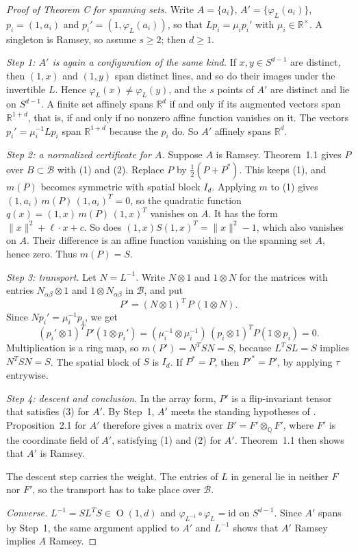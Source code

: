 \documentclass[11pt]{amsart}
\newcommand{\Q}{\mathbb{Q}}
\newcommand{\R}{\mathbb{R}}
\DeclareMathOperator{\Ort}{O}
\theoremstyle{plain}
\theoremstyle{definition}
\begin{document}
\begin{proof}[Proof of Theorem C for spanning sets]
Write $A=\{a_i\}$, $A'=\{\varphi_L(a_i)\}$, $p_i=(1,a_i)$ and $p_i'=(1,\varphi_L(a_i))$, so that
$Lp_i=\mu_ip_i'$ with $\mu_i\in\R^\times$. A singleton is Ramsey, so assume $s\ge2$; then $d\ge1$.

\emph{Step 1: $A'$ is again a configuration of the same kind.} If $x,y\in S^{d-1}$ are distinct,
then $(1,x)$ and $(1,y)$ span distinct lines, and so do their images under the invertible $L$.
Hence $\varphi_L(x)\neq\varphi_L(y)$, and the $s$ points of $A'$ are distinct and lie on $S^{d-1}$.
A finite set affinely spans $\R^d$ if and only if its augmented vectors span $\R^{1+d}$, that is,
if and only if no nonzero affine function vanishes on it. The vectors $p_i'=\mu_i^{-1}Lp_i$ span
$\R^{1+d}$ because the $p_i$ do. So $A'$ affinely spans $\R^d$.

\emph{Step 2: a normalized certificate for $A$.} Suppose $A$ is Ramsey. Theorem~1.1 gives $P$ over
$B\subset\mathscr B$ with (1) and (2). Replace $P$ by $\tfrac12(P+P^*)$. This keeps (1), and
$m(P)$ becomes symmetric with spatial block $I_d$. Applying $m$ to (1) gives
$(1,a_i)\,m(P)\,(1,a_i)^T=0$, so the quadratic function $q(x)=(1,x)\,m(P)\,(1,x)^T$ vanishes on $A$.
It has the form $\|x\|^2+\ell\cdot x+c$. So does $(1,x)S(1,x)^T=\|x\|^2-1$, which also vanishes on
$A$. Their difference is an affine function vanishing on the spanning set $A$, hence zero. Thus
$m(P)=S$.

\emph{Step 3: transport.} Let $N=L^{-1}$. Write $N\otimes1$ and $1\otimes N$ for the matrices with
entries $N_{\alpha\beta}\otimes1$ and $1\otimes N_{\alpha\beta}$ in $\mathscr B$, and put
\[
 P'=(N\otimes1)^T\,P\,(1\otimes N).
\]
Since $Np_i'=\mu_i^{-1}p_i$, we get
\[
 (p_i'\otimes1)^TP'(1\otimes p_i')
 =(\mu_i^{-1}\otimes\mu_i^{-1})\,(p_i\otimes1)^TP(1\otimes p_i)=0.
\]
Multiplication is a ring map, so $m(P')=N^TSN=S$, because $L^TSL=S$ implies $N^TSN=S$. The
spatial block of $S$ is $I_d$. If $P^*=P$, then $P'^*=P'$, by applying $\tau$ entrywise.

\emph{Step 4: descent and conclusion.} In the array form, $P'$ is a flip-invariant tensor that
satisfies (3) for $A'$. By Step~1, $A'$ meets the standing hypotheses of \cite[\S2]{OAI172}.
Proposition~2.1 for $A'$ therefore gives a matrix over $B'=F'\otimes_\Q F'$, where $F'$ is the
coordinate field of $A'$, satisfying (1) and (2) for $A'$. Theorem~1.1 then shows that $A'$ is
Ramsey.

The descent step carries the weight. The entries of $L$ in general lie in neither $F$ nor $F'$,
so the transport has to take place over $\mathscr B$.

\emph{Converse.} $L^{-1}=SL^TS\in\Ort(1,d)$ and $\varphi_{L^{-1}}\circ\varphi_L=\mathrm{id}$ on
$S^{d-1}$. Since $A'$ spans by Step~1, the same argument applied to $A'$ and $L^{-1}$ shows that
$A'$ Ramsey implies $A$ Ramsey.
\end{proof}
\end{document}
